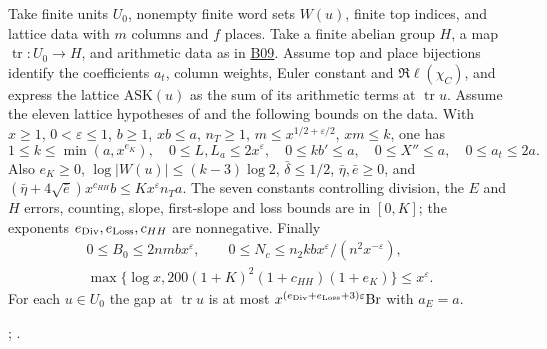 
\begin{proposition}\label{sub:B10}
Take finite units $U_0$, nonempty finite word sets $W(u)$, finite top
indices, and lattice data with $m$ columns and $f$ places. Take a finite
abelian group $H$, a map $\operatorname{tr}:U_0\to H$, and arithmetic
data as in \hyperref[sub:B09]{B09}. Assume top and place bijections
identify the coefficients $a_t$, column weights, Euler constant and
$\Re\ell(\chi_C)$, and express the lattice $\mathrm{ASK}(u)$ as the
sum of its arithmetic terms at $\operatorname{tr}u$.
Assume the eleven lattice hypotheses of  and the following
bounds on the data. With $x\ge1$, $0<\varepsilon\le1$,
$b\ge1$, $xb\le a$, $n_T\ge1$, $m\le x^{1/2+\varepsilon/2}$,
$xm\le k$, one has
\[
 1\le k\le\min(a,x^{e_K}),\quad 0\le L,L_a\le2x^\varepsilon,\quad
 0\le kb'\le a,\quad 0\le X''\le a,\quad 0\le a_t\le2a .
\]
Also $e_K\ge0$, $\log|W(u)|\le(k-3)\log2$, $\bar\delta\le1/2$,
$\bar\eta,\bar e\ge0$, and
$(\bar\eta+4\sqrt{\bar e})x^{c_{HH}}b\le Kx^\varepsilon n_Ta$.
The seven constants controlling division, the $E$ and $H$ errors, counting,
slope, first-slope and loss bounds are in $[0,K]$; the exponents
$e_{\rm Div},e_{\rm Loss},c_{HH}$ are nonnegative. Finally
\[
\begin{gathered}
 0\le B_0\le 2nmbx^\varepsilon,\qquad
 0\le N_c\le n_2 k b x^\varepsilon/(n^2x^{-\varepsilon}),\\
 \max\{\log x,200(1+K)^2(1+c_{HH})(1+e_K)\}\le x^\varepsilon .
\end{gathered}
\]
For each $u\in U_0$ the gap at $\operatorname{tr}u$ is at most
$x^{(e_{\rm Div}+e_{\rm Loss}+3)\varepsilon}\mathrm{Br}$ with $a_E=a$.
\end{proposition}
;
.
